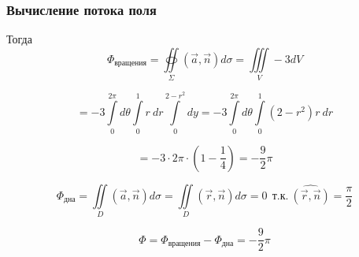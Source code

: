 \begin{frame}\frametitle{Вычисление потока поля}

	Тогда
	\begin{equation*}
		\Phi_{\text{вращения}} = \oiint\limits_{\Sigma}\left( \vec {a}, \vec {n} \right) d\sigma = \iiint\limits_V -3 dV
	\end{equation*}

	\begin{equation*}
		= -3 \int\limits_{0}^{2 \pi} d \theta
		\int\limits_{0}^{1} r~dr
		\int\limits_{0}^{2-r^2} dy
		= -3 \int\limits_{0}^{2 \pi} d \theta
		\int\limits_{0}^{1} (2-r^2)r~dr
	\end{equation*}

	\begin{equation*}
		= -3 \cdot 2 \pi \cdot
		(1 - \frac{1}{4})
		= - \frac{9}{2}\pi
	\end{equation*}

	\begin{equation*}
		\Phi_{\text{дна}} = \iint\limits_{D}(\vec{a},\vec{n})d\sigma =  \iint\limits_{D}(\vec{r},\vec{n})d\sigma = 0 ~~ \text{т.к.} ~ \widehat{(\vec{r}, \vec{n})} = \frac{\pi}{2}
	\end{equation*}

	\begin{equation*}
		\Phi = \Phi_{\text{вращения}} - \Phi_{\text{дна}} = -\frac{9}{2}\pi
	\end{equation*}
\end{frame}
